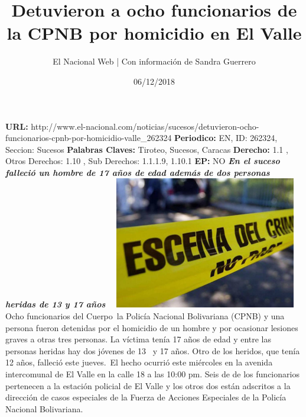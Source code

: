 \documentclass{article}%
\title{\textbf{Detuvieron a ocho funcionarios de la CPNB por homicidio en El Valle}}%
\author{El Nacional Web | Con información de Sandra Guerrero}%
\date{06/12/2018}%
\begin{document}
%
\normalsize%
\maketitle%
\textbf{URL: }%
http://www.el{-}nacional.com/noticias/sucesos/detuvieron{-}ocho{-}funcionarios{-}cpnb{-}por{-}homicidio{-}valle\_262324\newline%
%
\textbf{Periodico: }%
EN, %
ID: %
262324, %
Seccion: %
Sucesos\newline%
%
\textbf{Palabras Claves: }%
Tiroteo, Sucesos, Caracas\newline%
%
\textbf{Derecho: }%
1.1%
, Otros Derechos: %
1.10%
, Sub Derechos: %
1.1.1.9, 1.10.1%
\newline%
%
\textbf{EP: }%
NO\newline%
\newline%
%
\textbf{\textit{En el suceso falleció un hombre de 17 años de edad además de dos personas heridas de 13 y 17 años ~}}%
\newline%
\newline%
%
\includegraphics[width=300px]{16.jpg}%
\newline%
%
Ocho funcionarios del Cuerpo~la Policía Nacional Bolivariana (CPNB) y una persona fueron detenidas por el homicidio de un hombre y por ocasionar lesiones graves a otras tres personas.%
\newline%
%
La víctima tenía 17 años de edad y entre las personas heridas hay dos jóvenes de 13~ y 17 años. Otro de los heridos, que tenía 12 años, falleció este jueves.~El hecho ocurrió este miércoles en la avenida intercomunal de El Valle en la calle 18 a las 10:00 pm.%
\newline%
%
Seis de de los funcionarios pertenecen a la estación policial de El Valle y los otros dos están adscritos a la dirección de casos especiales de la Fuerza de Acciones Especiales de la Policía Nacional Bolivariana.%
\newline%
%
\end{document}

